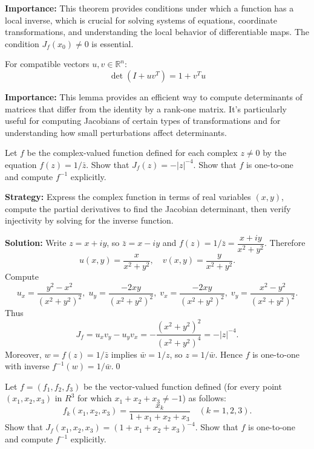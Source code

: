 \noindent\textbf{Importance:} This theorem provides conditions under which a function has a local inverse, which is crucial for solving systems of equations, coordinate transformations, and understanding the local behavior of differentiable maps. The condition $J_f(x_0) \neq 0$ is essential.



\begin{theorem}
For compatible vectors $u, v \in \mathbb{R}^n$:
\[\det(I + uv^T) = 1 + v^T u\]
\end{theorem}

\noindent\textbf{Importance:} This lemma provides an efficient way to compute determinants of matrices that differ from the identity by a rank-one matrix. It's particularly useful for computing Jacobians of certain types of transformations and for understanding how small perturbations affect determinants.




\begin{problembox}
\begin{problemstatement}
Let \( f \) be the complex-valued function defined for each complex \( z \neq 0 \) by the equation \( f(z) = 1/\bar{z} \). Show that \( J_f(z) = -|z|^{-4} \). Show that \( f \) is one-to-one and compute \( f^{-1} \) explicitly.
\end{problemstatement}
\end{problembox}

\noindent\textbf{Strategy:} Express the complex function in terms of real variables $(x,y)$, compute the partial derivatives to find the Jacobian determinant, then verify injectivity by solving for the inverse function.

\bigskip\noindent\textbf{Solution:}
Write $z=x+iy$, so $\bar z=x-iy$ and $f(z)=1/\bar z=\dfrac{x+iy}{x^2+y^2}$. Therefore
\[u(x,y)=\frac{x}{x^2+y^2},\quad v(x,y)=\frac{y}{x^2+y^2}.
\]
Compute
\[u_x=\frac{y^2-x^2}{(x^2+y^2)^2},\; u_y=\frac{-2xy}{(x^2+y^2)^2},\; v_x=\frac{-2xy}{(x^2+y^2)^2},\; v_y=\frac{x^2-y^2}{(x^2+y^2)^2}.
\]
Thus
\[J_f=u_xv_y-u_yv_x=-\frac{(x^2+y^2)^2}{(x^2+y^2)^4}=-|z|^{-4}.
\]
Moreover, $w=f(z)=1/\bar z$ implies $\bar w=1/z$, so $z=1/\bar w$. Hence $f$ is one-to-one with inverse $f^{-1}(w)=1/\bar w$.\qed


\begin{problembox}
\begin{problemstatement}
Let \( f = (f_1, f_2, f_3) \) be the vector-valued function defined (for every point \( (x_1, x_2, x_3) \) in \( R^3 \) for which \( x_1 + x_2 + x_3 \neq -1 \)) as follows:
\[f_k(x_1, x_2, x_3) = \frac{x_k}{1 + x_1 + x_2 + x_3} \quad (k = 1, 2, 3).\]
Show that \( J_f(x_1, x_2, x_3) = (1 + x_1 + x_2 + x_3)^{-4} \). Show that \( f \) is one-to-one and compute \( f^{-1} \) explicitly.
\end{problemstatement}
\end{problembox}

